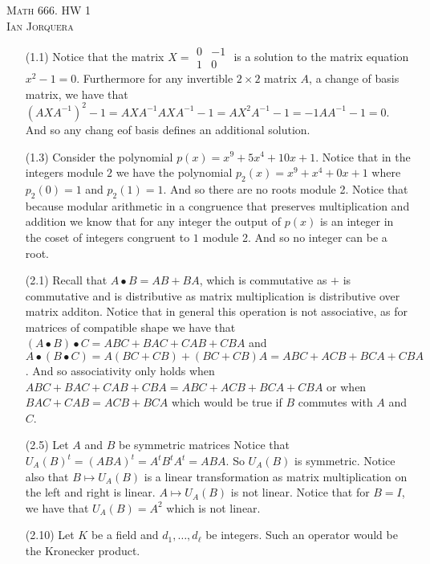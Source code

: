 \documentclass[12pt]{amsart}
\begin{document}
\begin{center}
    \textsc{Math 666. HW 1\\ Ian Jorquera}
\end{center}
\vspace{1em}

\begin{itemize}
\item[(1.1)] Notice that the matrix $X=\boxed{\begin{matrix} 0 & -1 \\ 1 & 0 \end{matrix}}$ is a solution to the matrix equation $x^2-1=0$. Furthermore 
for any invertible $2\times 2$ matrix $A$, a change of basis matrix, we have that $(AXA^{-1})^2-1=AXA^{-1}AXA^{-1}-1=AX^2A^{-1}-1=-1AA^{-1}-1=0$. And so 
any chang eof basis defines an additional solution.

\item[(1.3)] Consider the polynomial $p(x)=x^9+5x^4+10x+1$. Notice that in the integers module $2$ we have the polynomial $p_2(x)=x^9+x^4+0x+1$ where 
$p_2(0)=1$ and $p_2(1)=1$. And so there are no roots module 2. Notice that because modular arithmetic in a congruence that preserves multiplication and 
addition we know that for any integer the output of $p(x)$ is an integer in the coset of integers congruent to $1$ module 2. And so no integer can be a root.\\

\item[(2.1)] Recall that $A\bullet B=AB+BA$, which is commutative as $+$ is commutative and is distributive as matrix multiplication is distributive over 
matrix additon. Notice that in general this operation is not associative, as for matrices of compatible shape we have that 
$(A\bullet B)\bullet C=ABC+BAC+CAB+CBA$ and $A\bullet (B\bullet C)=A(BC+CB)+(BC+CB)A=ABC+ACB+BCA+CBA$. And so associativity only holds when 
$ABC+BAC+CAB+CBA=ABC+ACB+BCA+CBA$ or when $BAC+CAB=ACB+BCA$ which would be true if $B$ commutes with $A$ and $C$.\\

\item[(2.5)] Let $A$ and $B$ be symmetric matrices Notice that $U_A(B)^t=(ABA)^t=A^tB^tA^t=ABA$. So $U_A(B)$ is symmetric. Notice also that $B\mapsto U_A(B)$ 
is a linear transformation as matrix multiplication on the left and right is linear. $A\mapsto U_A(B)$ is not linear. Notice that for $B=I$, we have that 
$U_A(B)=A^2$ which is not linear.\\


\item[(2.10)] Let $K$ be a field and $d_1,\dots,d_\ell$ be integers. Such an operator would be the Kronecker product.

\end{itemize}
\end{document}
